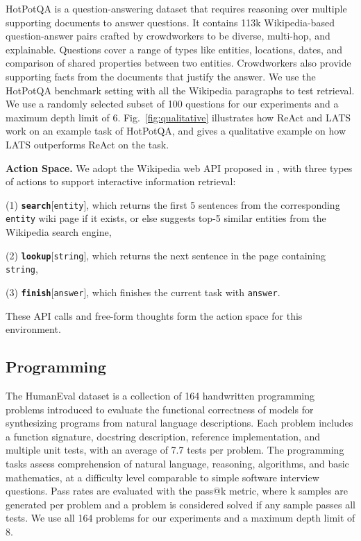 \documentclass{article} \usepackage{iclr2024_conference,times}
\begin{document}
HotPotQA \citep{yang2018hotpotqa} is a question-answering dataset that requires reasoning over multiple supporting documents to answer questions. It contains 113k Wikipedia-based question-answer pairs crafted by crowdworkers to be diverse, multi-hop, and explainable. Questions cover a range of types like entities, locations, dates, and comparison of shared properties between two entities. Crowdworkers also provide supporting facts from the documents that justify the answer. We use the HotPotQA benchmark setting with all the Wikipedia paragraphs to test retrieval. We use a randomly selected subset of 100 questions for our experiments and a maximum depth limit of 6. {Fig.~\ref{fig:qualitative} illustrates how ReAct and LATS work on an example task of HotPotQA, and gives a qualitative example on how LATS outperforms ReAct on the task. }

\textbf{Action Space.} We adopt the Wikipedia web API proposed in \citet{yao2023react}, with three types of actions to support interactive information retrieval: 

(1) \textbf{\texttt{search}}[\texttt{entity}], which returns the first 5 sentences from the corresponding \texttt{entity} wiki page if it exists, or else suggests top-5 similar entities from the Wikipedia search engine, 

(2) \textbf{\texttt{lookup}}[\texttt{string}], which returns the next sentence in the page containing \texttt{string}, 

(3) \textbf{\texttt{finish}}[\texttt{answer}], which finishes the current task with \texttt{answer}.

These API calls and free-form thoughts form the action space for this environment.

\subsection{Programming}

The HumanEval dataset \citep{chen2021evaluating} is a collection of 164 handwritten programming problems introduced to evaluate the functional correctness of models for synthesizing programs from natural language descriptions. Each problem includes a function signature, docstring description, reference implementation, and multiple unit tests, with an average of 7.7 tests per problem. The programming tasks assess comprehension of natural language, reasoning, algorithms, and basic mathematics, at a difficulty level comparable to simple software interview questions. Pass rates are evaluated with the pass@k metric, where k samples are generated per problem and a problem is considered solved if any sample passes all tests. We use all 164 problems for our experiments and a maximum depth limit of 8.
\end{document}
